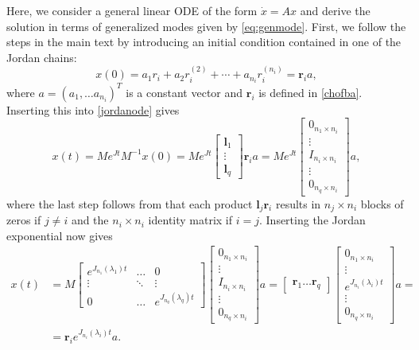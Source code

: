 \documentclass[../main.tex]{subfiles}
\begin{document}
Here, we consider a general linear ODE of the form $\dot x = Ax$ and derive the solution in terms of generalized modes given by \cref{eq:genmode}. First, we follow the steps in the main text by introducing an initial condition contained in one of the Jordan chains:
\begin{equation}\label{eq:appini}
    x(0) = a_1r_i + a_2r_i^{(2)} + \cdots + a_{n_i}r_i^{(n_i)} = \boldsymbol{r}_ia,
\end{equation}
where $a = (a_1, \dots a_{n_i})^T$ is a constant vector and $\boldsymbol{r}_i$ is defined in \cref{chofba}. Inserting this into \cref{jordanode} gives
\begin{equation}\label{eq:appyo}
    x(t) = Me^{Jt}M^{-1}x(0) = Me^{Jt} \begin{bmatrix} \boldsymbol{l}_1 \\ \vdots \\ \boldsymbol{l}_{q} \end{bmatrix} \boldsymbol{r}_ia = Me^{Jt}\begin{bmatrix} 0_{n_1\times n_i} \\ \vdots \\ I_{n_i\times n_i} \\ \vdots \\ 0_{n_q\times n_i}\end{bmatrix}a,
\end{equation}
where the last step follows from that each product $\boldsymbol{l}_j\boldsymbol{r}_i$ results in $n_j\times n_i$ blocks of zeros if $j\neq i$ and the $n_i\times n_i$ identity matrix if $i=j$. Inserting the Jordan exponential now gives
\begin{equation}\label{eq:appone}
    \begin{aligned}
        x(t) &= M \begin{bmatrix}e^{J_{n_1}(\lambda_1)t} & \dots & 0 \\
                            \vdots & \ddots & \vdots \\
                            0 & \dots &  e^{J_{n_q}(\lambda_q)t}\end{bmatrix}
            \begin{bmatrix} 0_{n_1\times n_i} \\ \vdots \\ I_{n_i\times n_i} \\ \vdots \\ 0_{n_q\times n_i}\end{bmatrix}a = \begin{bmatrix}\boldsymbol{r}_1 \dots \boldsymbol{r}_q\end{bmatrix} \begin{bmatrix} 0_{n_1\times n_i} \\ \vdots \\ e^{J_{n_i}(\lambda_i)t} \\ \vdots \\ 0_{n_q\times n_i}\end{bmatrix}a =\\&= \boldsymbol{r}_ie^{J_{n_i}(\lambda_i)t}a.
    \end{aligned}
\end{equation}
\end{document}
